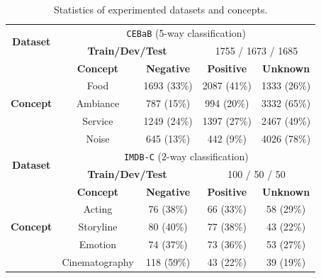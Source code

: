 \documentclass[letterpaper]{article} %
\begin{document}
\begin{table}[t]
\centering
\setlength{\tabcolsep}{1pt} %
\fontsize{9pt}{10pt}\selectfont
\begin{tabular}{@{}c|cccc@{}}
\toprule
\multirow{2}{*}{\textbf{Dataset}} & \multicolumn{4}{c}{\texttt{CEBaB}    (5-way classification)}                                   \\ \cmidrule(l){2-5} 
                                  & \multicolumn{2}{c|}{\textbf{Train/Dev/Test}} & \multicolumn{2}{c}{1755 / 1673 / 1685} \\ \midrule
\multirow{5}{*}{\textbf{Concept}} & \textbf{Concept}      & \textbf{Negative}    & \textbf{Positive}  & \textbf{Unknown}  \\ \cmidrule(l){2-5} 
                                  & Food                  & 1693 (33\%)        & 2087 (41\%)      & 1333 (26\%)     \\
                                  & Ambiance              & 787 (15\%)         & 994 (20\%)       & 3332 (65\%)     \\
                                  & Service               & 1249 (24\%)        & 1397 (27\%)      & 2467 (49\%)     \\
                                  & Noise                 & 645 (13\%)         & 442 (9\%)        & 4026 (78\%)     \\ \midrule
\multirow{2}{*}{\textbf{Dataset}} & \multicolumn{4}{c}{\texttt{IMDB-C}    (2-way classification)}                                    \\ \cmidrule(l){2-5} 
                                  & \multicolumn{2}{c|}{\textbf{Train/Dev/Test}} & \multicolumn{2}{c}{100 / 50 / 50}      \\ \midrule
\multirow{5}{*}{\textbf{Concept}} & \textbf{Concept}      & \textbf{Negative}    & \textbf{Positive}  & \textbf{Unknown}  \\ \cmidrule(l){2-5} 
                                  & Acting                & 76 (38\%)            & 66 (33\%)          & 58 (29\%)         \\
                                  & Storyline             & 80 (40\%)            & 77 (38\%)        & 43 (22\%)       \\
                                  & Emotion     & 74 (37\%)            & 73 (36\%)        & 53 (27\%)       \\
                                  & Cinematography        & 118 (59\%)           & 43 (22\%)        & 39 (19\%)       \\ \bottomrule
\end{tabular}
\caption{Statistics of experimented datasets and concepts.}\label{tab:data}
\end{table}
\end{document}
